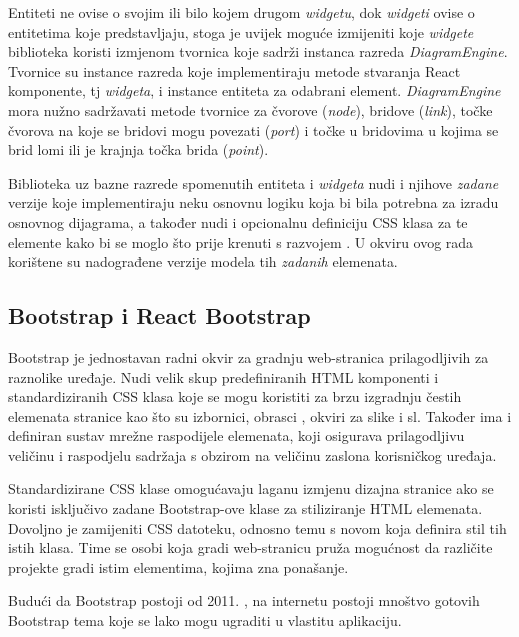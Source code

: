 \documentclass[times, utf8, diplomski, numeric]{fer}
\newcommand{\razmakp}{\vspace{18pt}}
\begin{document}
Entiteti ne ovise o svojim ili bilo kojem drugom \emph{widgetu}, dok \emph{widgeti} ovise o entitetima koje predstavljaju, stoga je uvijek moguće izmijeniti koje \emph{widgete} biblioteka koristi izmjenom tvornica koje sadrži instanca razreda \emph{DiagramEngine}.
Tvornice su instance razreda koje implementiraju metode stvaranja React komponente, tj \emph{widgeta}, i instance entiteta za odabrani element.
\emph{DiagramEngine} mora nužno sadržavati metode tvornice za čvorove (\emph{node}), bridove (\emph{link}), točke čvorova na koje se bridovi mogu povezati (\emph{port}) i točke u bridovima u kojima se brid lomi ili je krajnja točka brida (\emph{point}).

Biblioteka uz bazne razrede spomenutih entiteta i \emph{widgeta} nudi i njihove \emph{zadane}  verzije koje implementiraju neku osnovnu logiku koja bi bila potrebna za izradu osnovnog dijagrama, a također nudi i opcionalnu definiciju CSS klasa za te elemente kako bi se moglo što prije krenuti s razvojem \citep{storm_rd}.
U okviru ovog rada korištene su nadograđene verzije modela tih \emph{zadanih} elemenata.


\newpage
\subsection{Bootstrap i React Bootstrap}

Bootstrap je jednostavan radni okvir za gradnju web-stranica prilagodljivih za raznolike uređaje.
Nudi velik skup predefiniranih HTML komponenti i standardiziranih CSS klasa koje se mogu koristiti za brzu izgradnju čestih elemenata stranice kao što su izbornici, obrasci , okviri za slike i sl.
Također ima i definiran sustav mrežne raspodijele elemenata, koji osigurava prilagodljivu veličinu i raspodjelu sadržaja s obzirom na veličinu zaslona korisničkog uređaja.

Standardizirane CSS klase omogućavaju laganu izmjenu dizajna stranice ako se koristi isključivo zadane Bootstrap-ove klase za stiliziranje HTML elemenata.
Dovoljno je zamijeniti CSS datoteku, odnosno temu s novom koja definira stil tih istih klasa.
Time se osobi koja gradi web-stranicu pruža mogućnost da različite projekte gradi istim elementima, kojima zna ponašanje.

Budući da Bootstrap postoji od 2011. \citep{wiki_bs}, na internetu postoji mnoštvo gotovih Bootstrap tema koje se lako mogu ugraditi u vlastitu aplikaciju.

\razmakp
\end{document}
